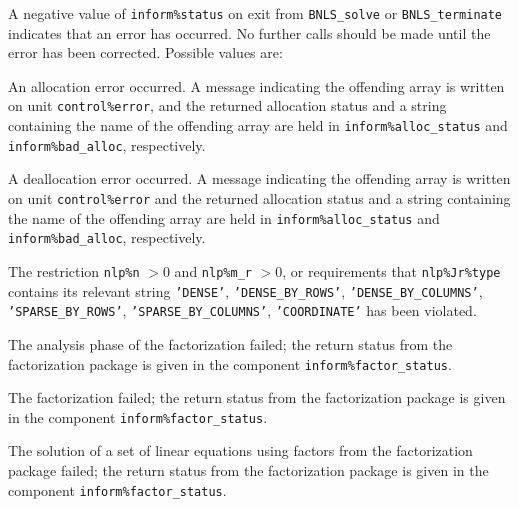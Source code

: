 \documentclass{galahad}
\newcommand{\packagename}{BNLS}
\begin{document}

\galerrors
A negative value of {\tt inform\%status} on exit from
{\tt \packagename\_solve}
or
{\tt \packagename\_terminate}
indicates that an error has occurred. No further calls should be made
until the error has been corrected. Possible values are:

\begin{description}

 An allocation error occurred.
A message indicating the offending
array is written on unit {\tt control\%error}, and the returned allocation
status and a string containing the name of the offending array
are held in {\tt inform\%alloc\_\-status}
and {\tt inform\%bad\_alloc}, respectively.

 A deallocation error occurred.
A message indicating the offending
array is written on unit {\tt control\%error} and the returned allocation
status and a string containing the name of the offending array
are held in {\tt inform\%alloc\_\-status}
and {\tt inform\%bad\_alloc}, respectively.

  The restriction {\tt nlp\%n} $> 0$ and {\tt nlp\%m\_r} $> 0$,
  or requirements that
  {\tt nlp\%Jr\%type}  contains its relevant string
  \mbox{\tt 'DENSE'}, 
  \mbox{\tt 'DENSE\_BY\_ROWS'}, 
  \mbox{\tt 'DENSE\_BY\_COLUMNS'}, 
  \mbox{\tt 'SPARSE\_BY\_ROWS'}, 
  \mbox{\tt 'SPARSE\_BY\_COLUMNS'}, 
  \mbox{\tt 'COORDINATE'} 
  has been violated.



 The analysis phase of the factorization failed;
 the return status from the factorization
    package is given in the component {\tt inform\%fac\-t\-or\_status}.

 The factorization failed;
 the return status from the factorization
    package is given in the component {\tt inform\%fac\-t\-or\_status}.

 The solution of a set of linear equations
 using factors from the factorization package failed;
 the return status from the factorization
    package is given in the component {\tt inform\%fac\-t\-or\_status}.


\end{description}
\end{document}
